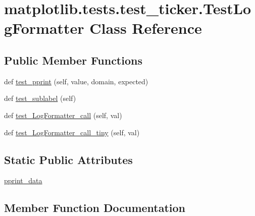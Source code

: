\hypertarget{classmatplotlib_1_1tests_1_1test__ticker_1_1TestLogFormatter}{}\section{matplotlib.\+tests.\+test\+\_\+ticker.\+Test\+Log\+Formatter Class Reference}
\label{classmatplotlib_1_1tests_1_1test__ticker_1_1TestLogFormatter}
\subsection*{Public Member Functions}
\begin{DoxyCompactItemize}
\item 
def \hyperlink{classmatplotlib_1_1tests_1_1test__ticker_1_1TestLogFormatter_a440399b3c34b0e8d84864397221be875}{test\+\_\+pprint} (self, value, domain, expected)
\item 
def \hyperlink{classmatplotlib_1_1tests_1_1test__ticker_1_1TestLogFormatter_ae28809eff1fb7dd8183a7a7772d31d94}{test\+\_\+sublabel} (self)
\item 
def \hyperlink{classmatplotlib_1_1tests_1_1test__ticker_1_1TestLogFormatter_a2b97fd95ba7b04353ec4c7a7c4b91ea6}{test\+\_\+\+Log\+Formatter\+\_\+call} (self, val)
\item 
def \hyperlink{classmatplotlib_1_1tests_1_1test__ticker_1_1TestLogFormatter_a7d9ed1c8637dbd7b585384ae2e93bd40}{test\+\_\+\+Log\+Formatter\+\_\+call\+\_\+tiny} (self, val)
\end{DoxyCompactItemize}
\subsection*{Static Public Attributes}
\begin{DoxyCompactItemize}
\item 
\hyperlink{classmatplotlib_1_1tests_1_1test__ticker_1_1TestLogFormatter_a12188a6109681761188d00eb730939a8}{pprint\+\_\+data}
\end{DoxyCompactItemize}


\subsection{Member Function Documentation}
\mbox{\label{classmatplotlib_1_1tests_1_1test__ticker_1_1TestLogFormatter_a2b97fd95ba7b04353ec4c7a7c4b91ea6}} 
